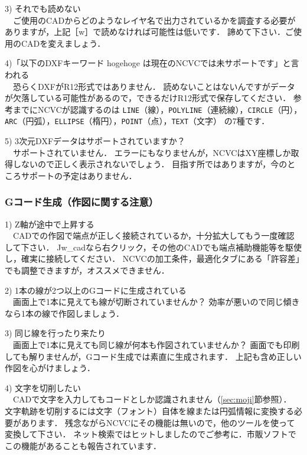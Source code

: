 \vspace*{2zh}
3) それでも読めない\\
　ご使用のCADからどのようなレイヤ名で出力されているかを調査する必要がありますが，上記［\yen{}w］で読めなければ可能性は低いです．
諦めて下さい．ご使用のCADを変えましょう．

\vspace*{1zh}
4)「以下のDXFキーワード hogehoge は現在のNCVCでは未サポートです」と言われる\\
　恐らくDXFがR12形式ではありません．
読めないことはないんですがデータが欠落している可能性があるので，できるだけR12形式で保存してください．
参考までにNCVCが認識するのは
\texttt{LINE}（線），\texttt{POLYLINE}（連続線），\texttt{CIRCLE}（円），\texttt{ARC}（円弧），\texttt{ELLIPSE}（楕円），\texttt{POINT}（点），\texttt{TEXT}（文字）
の7種です．

\vspace*{1zh}
5) 3次元DXFデータはサポートされていますか？\\
　サポートされていません．
エラーにもなりませんが，NCVCはXY座標しか取得しないので正しく表示されないでしょう．
目指す所ではありますが，今のところサポートの予定はありません．

\subsubsection{Gコード生成（作図に関する注意）}

1) Z軸が途中で上昇する\\
　CADでの作図で端点が正しく接続されているか，十分拡大してもう一度確認して下さい．
Jw\_cadなら右クリック，その他のCADでも端点補助機能等を駆使し，確実に接続してください．
NCVCの加工条件，最適化タブにある「許容差」でも調整できますが，オススメできません．

\vspace*{1zh}
2) 1本の線が2つ以上のGコードに生成されている\\
　画面上で1本に見えても線が切断されていませんか？
効率が悪いので同じ傾きなら1本の線で作図しましょう．

\vspace*{1zh}
3) 同じ線を行ったり来たり\\
　画面上で1本に見えても同じ線が何本も作図されていませんか？
画面でも印刷しても解りませんが，Gコード生成では素直に生成されます．
上記も含め正しい作図を心がけましょう．

\vspace*{1zh}
4) 文字を切削したい\\
　CADで文字を入力してもコードとしか認識されません（\ref{sec:moji}節参照）．
文字軌跡を切削するには文字（フォント）自体を線または円弧情報に変換する必要があります．
残念ながらNCVCにその機能は無いので，他のツールを使って変換して下さい．
ネット検索ではヒットしましたのでご参考に．市販ソフトでこの機能があることも報告されています．

